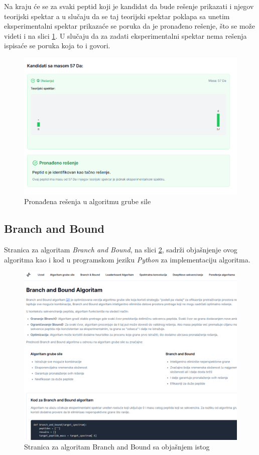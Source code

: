 \documentclass[12pt,oneside]{memoir}
\begin{document}
Na kraju će se za svaki peptid koji je kandidat da bude rešenje prikazati i njegov teorijski spektar a u slučaju da se taj teorijski spektar poklapa sa unetim eksperimentalni spektar prikazaće se poruka da je pronađeno rešenje, što se može videti i na slici \ref{fig:brute_force_3}. U slučaju da za zadati eksperimentalni spektar nema rešenja ispisaće se poruka koja to i govori.

\begin{figure}[H]
\centering
\includegraphics[width=1\textwidth]{images/brute_force_3.png}
\caption{Pronađena rešenja u algoritmu grube sile}
\label{fig:brute_force_3}
\end{figure}

\subsection{Branch and Bound}
Stranica za algoritam \emph{Branch and Bound}, na slici \ref{fig:branch_and_bound}, sadrži objašnjenje ovog algoritma kao i kod u programskom jeziku \emph{Python} za implementaciju algoritma.
\begin{figure}[h]
\centering
\includegraphics[width=1\textwidth]{images/branch_and_bound.png}
\caption{Stranica za algoritam Branch and Bound sa objašnjem istog}
\label{fig:branch_and_bound}
\end{figure}
\end{document}
